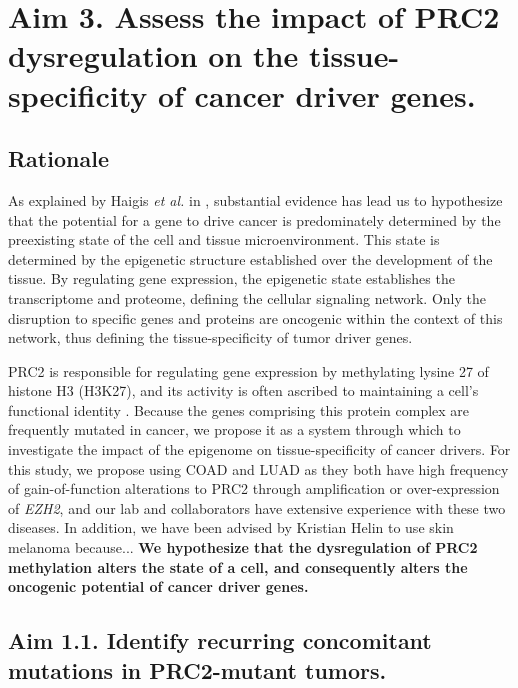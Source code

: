 \section{Aim 3. Assess the impact of PRC2 dysregulation on the tissue-specificity of cancer driver genes.}

\subsection*{Rationale}

As explained by Haigis \emph{et al.} in \cite{Haigis2019}, substantial evidence has lead us to hypothesize that the potential for a gene to drive cancer is predominately determined by the preexisting state of the cell and tissue microenvironment.
This state is determined by the epigenetic structure established over the development of the tissue.
By regulating gene expression, the epigenetic state establishes the transcriptome and proteome, defining the cellular signaling network.
Only the disruption to specific genes and proteins are oncogenic within the context of this network, thus defining the tissue-specificity of tumor driver genes.

PRC2 is responsible for regulating gene expression by methylating lysine 27 of histone H3 (H3K27), and its activity is often ascribed to maintaining a cell's functional identity \cite{Comet2016MaintainingCancer., Laugesen2019a}.
Because the genes comprising this protein complex are frequently mutated in cancer, we propose it as a system through which to investigate the impact of the epigenome on tissue-specificity of cancer drivers.
For this study, we propose using COAD and LUAD as they both have high frequency of gain-of-function alterations to PRC2 through amplification or over-expression of \emph{EZH2}, and our lab and collaborators have extensive experience with these two diseases.
In addition, we have been advised by Kristian Helin to use skin melanoma because...
\textbf{We hypothesize that the dysregulation of PRC2 methylation alters the state of a cell, and consequently alters the oncogenic potential of cancer driver genes.}


\subsection*{Aim 1.1. Identify recurring concomitant mutations in PRC2-mutant tumors.}


